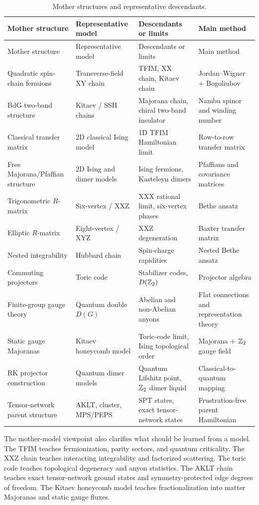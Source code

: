 \begin{longtable}{L{0.24\textwidth}L{0.22\textwidth}L{0.25\textwidth}L{0.19\textwidth}}
\caption{Mother structures and representative descendants.}\label{tab:mother-model-map-concluding}\\
\toprule
Mother structure & Representative model & Descendants or limits & Main method \\
\midrule
\endfirsthead
\toprule
Mother structure & Representative model & Descendants or limits & Main method \\
\midrule
\endhead
Quadratic spin-chain fermions & Transverse-field XY chain & TFIM, XX chain, Kitaev chain & Jordan--Wigner + Bogoliubov \\
BdG two-band structure & Kitaev / SSH chains & Majorana chain, chiral two-band insulator & Nambu spinor and winding number \\
Classical transfer matrix & 2D classical Ising model & 1D TFIM Hamiltonian limit & Row-to-row transfer matrix \\
Free Majorana/Pfaffian structure & 2D Ising and dimer models & Ising fermions, Kasteleyn dimers & Pfaffians and covariance matrices \\
Trigonometric \(R\)-matrix & Six-vertex / XXZ & XXX rational limit, six-vertex phases & Bethe ansatz \\
Elliptic \(R\)-matrix & Eight-vertex / XYZ & XXZ degeneration & Baxter transfer matrix \\
Nested integrability & Hubbard chain & Spin-charge rapidities & Nested Bethe ansatz \\
Commuting projectors & Toric code & Stabilizer codes, \(D(\mathbb{Z}_2)\) & Projector algebra \\
Finite-group gauge theory & Quantum double \(D(G)\) & Abelian and non-Abelian anyons & Flat connections and representation theory \\
Static gauge Majoranas & Kitaev honeycomb model & Toric-code limit, Ising topological order & Majorana + \(\mathbb{Z}_2\) gauge field \\
RK projector construction & Quantum dimer models & Quantum Lifshitz point, \(\mathbb{Z}_2\) dimer liquid & Classical-to-quantum mapping \\
Tensor-network parent structure & AKLT, cluster, MPS/PEPS & SPT states, exact tensor-network states & Frustration-free parent Hamiltonian \\
\bottomrule
\end{longtable}

The mother-model viewpoint also clarifies what should be learned from a model.  The TFIM teaches fermionization, parity sectors, and quantum criticality.  The XXZ chain teaches interacting integrability and factorized scattering.  The toric code teaches topological degeneracy and anyon statistics.  The AKLT chain teaches exact tensor-network ground states and symmetry-protected edge degrees of freedom.  The Kitaev honeycomb model teaches fractionalization into matter Majoranas and static gauge fluxes.

